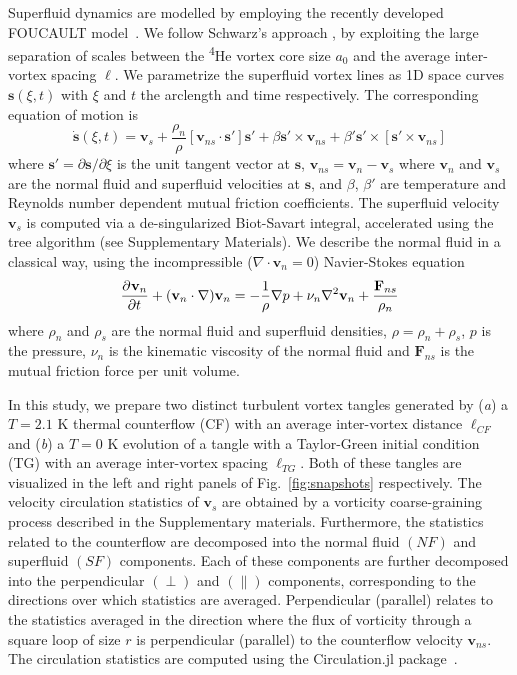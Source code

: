\documentclass[%
 reprint,
 amsmath,amssymb,
 aps,
 prl,
]{revtex4-2}
\newcommand{\pderiv}[3][\null]{\ensuremath{\dfrac{\partial^{#1} #2}{\partial #3^{#1}}}}%
\def\s{\mathbf{s}}
\def\v{\mathbf{v}}
\begin{document}
Superfluid dynamics are modelled by employing the recently developed \textsc{FOUCAULT} model~\cite{galantucci2020}. 
We follow Schwarz's approach \cite{schwarz1988}, by exploiting the large separation of scales between the \textsuperscript{4}He vortex core size $a_0$ and the average inter-vortex spacing $\ell$. 
We parametrize the superfluid vortex lines as 1D space curves $\s(\xi,t)$ with $\xi$ and $t$ the arclength and time respectively. 
The corresponding equation of motion is
\begin{equation}
	\dot{\s}(\xi,t) = \v_s + \frac{\rho_n}{\rho}\left[\v_{ns}\cdot\s'\right]\s' + \beta\s'\times\v_{ns} + \beta'\s'\times\left[\s'\times\v_{ns}\right]
\end{equation}
where $\s'=\partial\s/\partial\xi$ is the unit tangent vector at $\s$, $\v_{ns} = \v_n - \v_s$ where $\v_n$ and $\v_s$ are the normal fluid and superfluid velocities at $\s$, and $\beta$, $\beta'$ are temperature and Reynolds number dependent mutual friction coefficients. 
The superfluid velocity $\v_s$ is computed via a de-singularized Biot-Savart integral, accelerated using the tree algorithm \cite{baggaley2012d} (see Supplementary Materials).
We describe the normal fluid in a classical way, using the incompressible ($\nabla\cdot\v_n = 0$) Navier-Stokes equation
\begin{equation}
  \pderiv{\v_n}{t} + (\v_n\cdot\nabla)\v_n =  -\frac{1}{\rho}\nabla p + \nu_n\nabla^2\v_n + \frac{\mathbf{F}_{ns}}{\rho_n} 
\end{equation}
where $\rho_n$ and $\rho_s$ are the normal fluid and superfluid densities, $\rho = \rho_n + \rho_s$, $p$ is the pressure, $\nu_n$ is the kinematic viscosity of the normal fluid and $\mathbf{F}_{ns}$ is the mutual friction force per unit volume. 

In this study, we prepare two distinct turbulent vortex tangles generated by (\emph{a}) a $T=2.1$ K thermal counterflow (CF) with an average inter-vortex distance $\ell_{CF}$ and (\emph{b}) a $T=0$ K evolution of a tangle with a Taylor-Green initial condition (TG) with an average inter-vortex spacing $\ell_{TG}$.
Both of these tangles are visualized in the left and right panels of Fig.~\ref{fig:snapshots} respectively.
The velocity circulation statistics of $\v_s$ are obtained by a vorticity coarse-graining process described in the Supplementary materials.
Furthermore, the statistics related to the counterflow are decomposed into the normal fluid $(NF)$ and superfluid $(SF)$ components.
Each of these components are further decomposed into the perpendicular $(\perp)$ and $(\parallel)$ components, corresponding to the directions over which statistics are averaged.
Perpendicular (parallel) relates to the statistics averaged in the direction where the flux of vorticity through a square loop of size $r$ is perpendicular (parallel) to the counterflow velocity $\v_{ns}$.      
The circulation statistics are computed using the Circulation.jl package~\cite{polanco2021a}.
\end{document}
